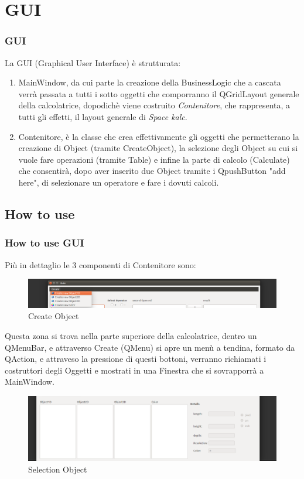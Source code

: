 \documentclass[10pt]{beamer}
\begin{document}
\section{GUI}

\begin{frame}
\frametitle{GUI}
La GUI (Graphical User Interface) è strutturata:
\begin{enumerate}
\item MainWindow, da cui parte la creazione della BusinessLogic che a cascata verrà passata a tutti i sotto oggetti che comporranno il QGridLayout generale della calcolatrice, dopodichè viene costruito \textit{Contenitore}, che rappresenta, a tutti gli effetti, il layout generale di \textit{Space kalc}.

\item Contenitore, è la classe che crea effettivamente gli oggetti che permetterano la creazione di Object (tramite CreateObject), la selezione degli Object su cui si vuole fare operazioni (tramite Table) e infine la parte di calcolo (Calculate) che consentirà, dopo aver inserito due Object tramite i QpushButton "add here", di selezionare un operatore e fare i dovuti calcoli.
\end{enumerate}
\end{frame}

\subsection{How to use} 
\begin{frame}
\frametitle{How to use GUI}
Più in dettaglio le 3 componenti di Contenitore sono:

   \FloatBarrier
   \begin{figure}[ht]
   \centering
   \includegraphics[scale=0.20]{Creazione.png}
   \caption{Create Object}
\end{figure}
Questa zona si trova nella parte superiore della calcolatrice, dentro un QMenuBar, e attraverso Create (QMenu) si apre un menù a tendina, formato da QAction, e attraveso la pressione di questi bottoni, verranno richiamati i costruttori degli Oggetti e mostrati in una Finestra che si sovrapporrà a MainWindow.


   \FloatBarrier
   \begin{figure}[ht]
   \centering
   \includegraphics[scale=0.10]{Selezione.png}
   \caption{Selection Object}
\end{figure}


\end{frame}
\end{document}
